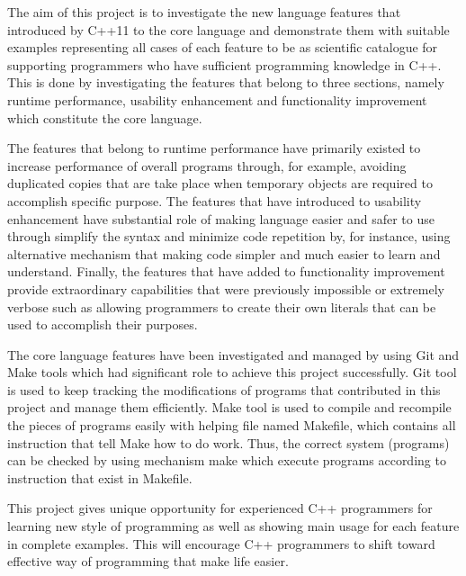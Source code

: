 \documentclass[11pt]{report}
\begin{document}
The aim  of this project is to investigate the new language features that introduced by C++11 to the core language and demonstrate them with suitable examples representing all cases of each feature to be as scientific catalogue for supporting programmers who have sufficient programming knowledge in C++.  This is done by investigating the features that belong to three sections, namely runtime performance, usability enhancement and functionality improvement which constitute the core language.

The features that belong to runtime performance have primarily existed to increase performance of overall programs through, for example, avoiding duplicated copies that are take place when temporary objects are required to accomplish specific purpose. The features that have introduced to usability enhancement have substantial role of making language easier and safer to use through simplify the syntax and minimize code repetition by, for instance, using alternative mechanism that making code simpler and much easier to learn and understand. Finally, the features that have added to functionality improvement  provide extraordinary capabilities that were previously impossible or extremely verbose such as allowing programmers to create their own literals that can be used to accomplish their purposes. 

The core language features have been investigated and managed by using Git and Make tools which had significant role to achieve this project successfully. Git tool is used to keep tracking the modifications of programs that contributed in this project and manage them efficiently. Make tool is used to compile and recompile the pieces of programs easily with helping file named Makefile, which contains all instruction that tell Make how to do work. Thus, the correct system (programs) can be checked by using mechanism make which execute programs according to instruction that exist in Makefile.

This project gives unique opportunity for experienced C++ programmers for learning new style of programming as well as showing main usage for each feature in complete examples. This will encourage C++ programmers to shift toward effective way of programming that make life easier.
\end{document}
